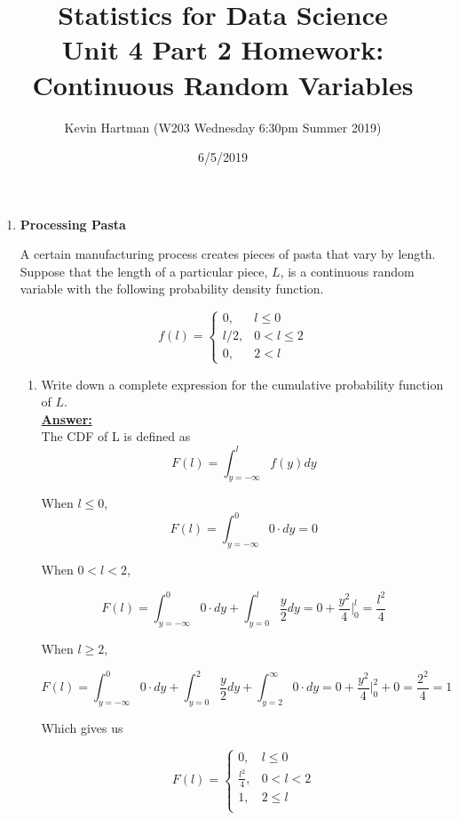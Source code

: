 \documentclass[12pt,a4paper]{article}
\numberwithin{equation}{subsection}
\begin{document}



\author{Kevin Hartman (W203 Wednesday 6:30pm Summer 2019)}
\date{6/5/2019}
\title{Statistics for Data Science \\
       Unit 4 Part 2 Homework: Continuous Random Variables}
\maketitle

\begin{enumerate}

\item \textbf{Processing Pasta}

A certain manufacturing process creates pieces of pasta that vary by length.  Suppose that the length of a particular piece, $L$, is a continuous random variable with the following probability density function.

$$f(l) = \begin{cases} 0, &l \leq 0 \\
l/2, &0 < l \leq 2 \\ 
0, &2 < l
\end{cases}
$$

\begin{enumerate}
\item Write down a complete expression for the cumulative probability function of $L$.
\\
\textbf{\underline{Answer:}}
\\
The CDF of L is defined as
$$F(l) = \int_{y=-\infty}^{l} f(y) dy$$


When $l \leq 0$,
$$F(l) = \int_{y=-\infty}^{0}  0 \cdot dy = 0$$

When $0 < l < 2$,

$$F(l) = \int_{y=-\infty}^{0} 0 \cdot dy + \int_{y=0}^{l} \frac{y}{2} dy = 0 + \frac{y^2}{4}\bigg|_0^l= \frac{l^2}{4}$$

When $l \geq 2$,

$$F(l) = \int_{y=-\infty}^{0} 0 \cdot dy + \int_{y=0}^{2} \frac{y}{2} dy  + \int_{y=2}^{\infty} 0 \cdot dy = 0 + \frac{y^2}{4}\bigg|_0^2 + 0 = \frac{2^2}{4} = 1$$

Which gives us

$$F(l) = \begin{cases}
0, & l \leq 0 \\
\frac{l^{2}}{4}, & 0 < l < 2\\
1, & 2 \leq l \\
\end{cases}$$


\end{enumerate}
\end{enumerate}
\end{document}
